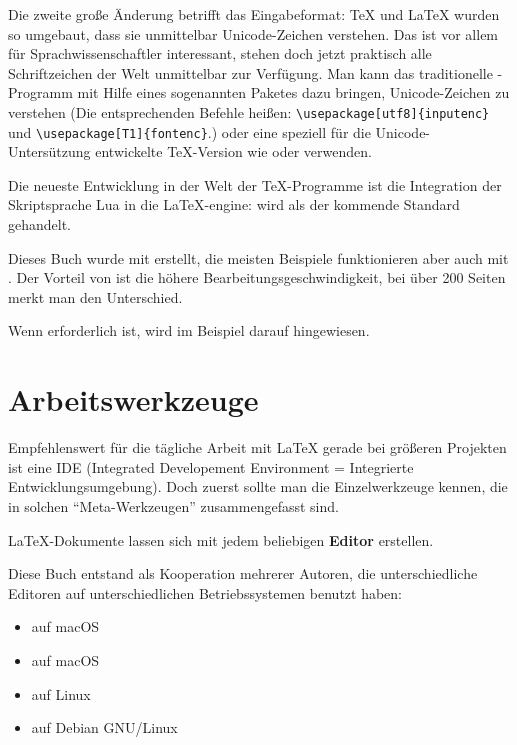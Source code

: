 Die zweite große Änderung betrifft das Eingabeformat:
\TeX{} und \LaTeX{} wurden so umgebaut, dass sie unmittelbar Unicode-Zeichen verstehen.
Das ist vor allem für Sprachwissenschaftler interessant, stehen doch jetzt praktisch alle Schriftzeichen
der Welt unmittelbar zur Verfügung. 
Man kann das traditionelle \pdfLaTeX-Programm mit Hilfe eines sogenannten Paketes dazu bringen, Unicode-Zeichen
zu verstehen
(Die entsprechenden Befehle heißen: \lstinline/\usepackage[utf8]{inputenc}/ 
und \lstinline/\usepackage[T1]{fontenc}/.)
oder eine speziell für die Unicode-Untersützung entwickelte \TeX{}-Version wie \XeLaTeX{} 
oder \LuaLaTeX{} verwenden.

Die neueste Entwicklung in der Welt der \TeX-Programme ist die Integration der Skriptsprache
Lua in die \LaTeX-engine: \LuaLaTeX{} wird als der kommende Standard gehandelt.

Dieses Buch wurde mit \LuaLaTeX{} erstellt, die meisten Beispiele funktionieren aber auch mit \pdfLaTeX{}.
Der Vorteil von \pdfLaTeX{} ist die höhere Bearbeitungsgeschwindigkeit, bei über 200 Seiten merkt man
den Unterschied.

Wenn \LuaLaTeX{} erforderlich ist, wird im Beispiel darauf hingewiesen.

\section{Arbeitswerkzeuge}

Empfehlenswert für die tägliche Arbeit mit \LaTeX{} gerade bei größeren Projekten ist eine 
IDE (Integrated Developement Environment = Integrierte Entwicklungsumgebung).
Doch zuerst sollte man die Einzelwerkzeuge kennen, die in solchen \enquote{Meta-Werkzeugen}
zusammengefasst sind.


\LaTeX{}-Dokumente lassen sich mit jedem beliebigen \textbf{Editor} erstellen.

Diese Buch entstand als Kooperation mehrerer Autoren, die unterschiedliche Editoren
auf unterschiedlichen Betriebssystemen benutzt haben:

\begin{itemize}
\item {} auf macOS
\item {} auf macOS
\item {} auf Linux
\item {} auf Debian GNU/Linux
\end{itemize}

